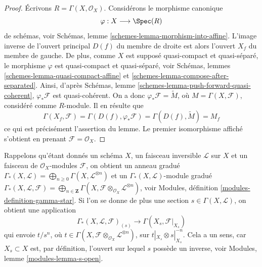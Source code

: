 \begin{proof}
Écrivons $R = \Gamma(X, \mathcal{O}_X)$. Considérons le morphisme canonique
$$
\varphi : X \longrightarrow \Spec(R)
$$
de schémas, voir
Schémas, lemme
\ref{schemes-lemma-morphism-into-affine}.
L'image inverse de l'ouvert principal $D(f)$ du membre de droite
est alors l'ouvert $X_f$ du membre de gauche.
De plus, comme $X$ est supposé quasi-compact et quasi-séparé,
le morphisme $\varphi$ est quasi-compact et quasi-séparé,
voir Schémas, lemmes \ref{schemes-lemma-quasi-compact-affine} et
\ref{schemes-lemma-compose-after-separated}. Ainsi, d'après
Schémas, lemme \ref{schemes-lemma-push-forward-quasi-coherent},
$\varphi_*\mathcal{F}$ est quasi-cohérent.
On a donc $\varphi_*\mathcal{F} = \widetilde M$,
où $M = \Gamma(X, \mathcal{F})$, considéré comme $R$-module.
Il en résulte que
$$
\Gamma(X_f, \mathcal{F}) =
\Gamma(D(f), \varphi_*\mathcal{F}) =
\Gamma(D(f), \widetilde M) = M_f
$$
ce qui est précisément l'assertion du lemme. Le premier isomorphisme affiché
s'obtient en prenant $\mathcal{F} = \mathcal{O}_X$.
\end{proof}

\noindent
Rappelons qu'étant donnés un schéma $X$, un faisceau inversible $\mathcal{L}$
sur $X$ et un faisceau de $\mathcal{O}_X$-modules $\mathcal{F}$,
on obtient un anneau gradué
$\Gamma_*(X, \mathcal{L}) =
\bigoplus\nolimits_{n \geq 0} \Gamma(X, \mathcal{L}^{\otimes n})$
et un $\Gamma_*(X, \mathcal{L})$-module gradué
$\Gamma_*(X, \mathcal{L}, \mathcal{F}) =
\bigoplus\nolimits_{n \in \mathbf{Z}}
\Gamma(X, \mathcal{F} \otimes_{\mathcal{O}_X} \mathcal{L}^{\otimes n})$,
voir Modules, définition \ref{modules-definition-gamma-star}.
Si l'on se donne de plus une section $s \in \Gamma(X, \mathcal{L})$,
on obtient une application
\begin{equation}
\label{equation-module-invert-s}
\Gamma_*(X, \mathcal{L}, \mathcal{F})_{(s)}
\longrightarrow
\Gamma(X_s, \mathcal{F}|_{X_s})
\end{equation}
qui envoie $t/s^n$, où
$t \in \Gamma(X, \mathcal{F} \otimes_{\mathcal{O}_X} \mathcal{L}^{\otimes n})$,
sur $t|_{X_s} \otimes s|_{X_s}^{-n}$. Cela a un sens,
car $X_s \subset X$ est, par définition, l'ouvert sur lequel
$s$ possède un inverse, voir Modules, lemme \ref{modules-lemma-s-open}.

